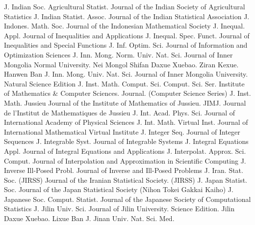 {J. Indian Soc. Agricultural Statist.}
{Journal of the Indian Society of Agricultural Statistics}
{J. Indian Statist. Assoc.}
{Journal of the Indian Statistical Association}
{J. Indones. Math. Soc.}
{Journal of the Indonesian Mathematical Society}
{J. Inequal. Appl.}
{Journal of Inequalities and Applications}
{J. Inequal. Spec. Funct.}
{Journal of Inequalities and Special Functions}
{J. Inf. Optim. Sci.}
{Journal of Information and Optimization Sciences}
{J. Inn. Mong. Norm. Univ. Nat. Sci.}
{Journal of Inner Mongolia Normal University. Nei Mongol Shifan Daxue Xuebao. Ziran Kexue. Hanwen Ban}
{J. Inn. Mong. Univ. Nat. Sci.}
{Journal of Inner Mongolia University. Natural Science Edition}
{J. Inst. Math. Comput. Sci. Comput. Sci. Ser.}
{Institute of Mathematics & Computer Sciences. Journal. (Computer Science Series)}
{J. Inst. Math. Jussieu}
{Journal of the Institute of Mathematics of Jussieu. JIMJ. Journal de l'Institut de Mathematiques de Jussieu}
{J. Int. Acad. Phys. Sci.}
{Journal of International Academy of Physical Sciences}
{J. Int. Math. Virtual Inst.}
{Journal of International Mathematical Virtual Institute}
{J. Integer Seq.}
{Journal of Integer Sequences}
{J. Integrable Syst.}
{Journal of Integrable Systems}
{J. Integral Equations Appl.}
{Journal of Integral Equations and Applications}
{J. Interpolat. Approx. Sci. Comput.}
{Journal of Interpolation and Approximation in Scientific Computing}
{J. Inverse Ill-Posed Probl.}
{Journal of Inverse and Ill-Posed Problems}
{J. Iran. Stat. Soc. (JIRSS)}
{Journal of the Iranian Statistical Society. (JIRSS)}
{J. Japan Statist. Soc.}
{Journal of the Japan Statistical Society (Nihon Tokei Gakkai Kaiho)}
{J. Japanese Soc. Comput. Statist.}
{Journal of the Japanese Society of Computational Statistics}
{J. Jilin Univ. Sci.}
{Journal of Jilin University. Science Edition. Jilin Daxue Xuebao. Lixue Ban}
{J. Jinan Univ. Nat. Sci. Med.}
